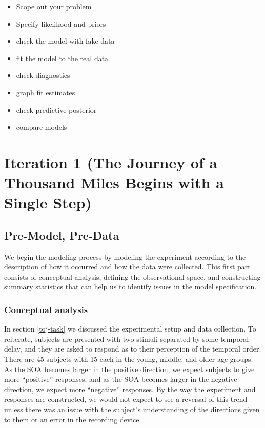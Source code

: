 \documentclass[11pt, oneside, openany]{scrbook}
\providecommand{\tightlist}{%
  \setlength{\itemsep}{0pt}\setlength{\parskip}{0pt}}
\begin{document}
\begin{itemize}
\tightlist
\item
  Scope out your problem
\item
  Specify likelihood and priors
\item
  check the model with fake data
\item
  fit the model to the real data
\item
  check diagnostics
\item
  graph fit estimates
\item
  check predictive posterior
\item
  compare models
\end{itemize}

\hypertarget{iteration-1-the-journey-of-a-thousand-miles-begins-with-a-single-step}{%
\section{Iteration 1 (The Journey of a Thousand Miles Begins with a Single Step)}\label{iteration-1-the-journey-of-a-thousand-miles-begins-with-a-single-step}}

\hypertarget{pre-model-pre-data}{%
\subsection{Pre-Model, Pre-Data}\label{pre-model-pre-data}}

We begin the modeling process by modeling the experiment according to the description of how it occurred and how the data were collected. This first part consists of conceptual analysis, defining the observational space, and constructing summary statistics that can help us to identify issues in the model specification.

\hypertarget{conceptual-analysis}{%
\subsubsection{Conceptual analysis}\label{conceptual-analysis}}

In section \ref{toj-task} we discussed the experimental setup and data collection. To reiterate, subjects are presented with two stimuli separated by some temporal delay, and they are asked to respond as to their perception of the temporal order. There are 45 subjects with 15 each in the young, middle, and older age groups. As the SOA becomes larger in the positive direction, we expect subjects to give more ``positive'' responses, and as the SOA becomes larger in the negative direction, we expect more ``negative'' responses. By the way the experiment and responses are constructed, we would not expect to see a reversal of this trend unless there was an issue with the subject's understanding of the directions given to them or an error in the recording device.
\end{document}
